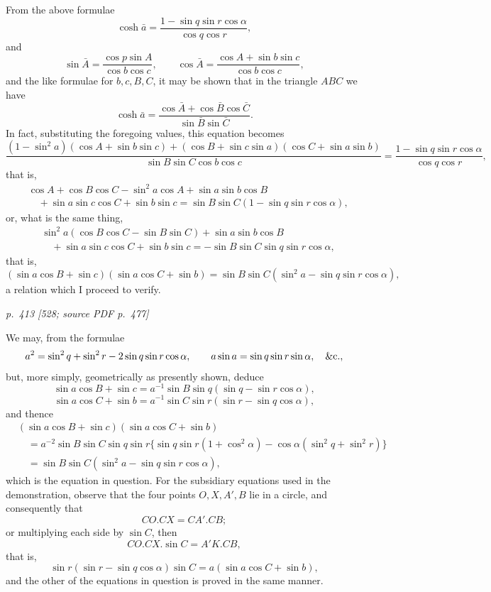\documentclass[11pt,a4paper]{article}
\newcommand{\pagemarker}[3]{\par\bigskip\noindent\textit{p.~#1 [#2; source PDF p.~#3]}\par\smallskip}
\begin{document}
From the above formulae
\[
\cosh\bar a=\frac{1-\sin q\sin r\cos\alpha}{\cos q\cos r},
\]
and
\[
\sin\bar A=\frac{\cos p\sin A}{\cos b\cos c},\qquad
\cos\bar A=\frac{\cos A+\sin b\sin c}{\cos b\cos c},
\]
and the like formulae for $b,c,B,C$, it may be shown that in the triangle $ABC$ we
have
\[
\cosh\bar a=\frac{\cos\bar A+\cos\bar B\cos\bar C}{\sin\bar B\sin\bar C}.
\]
In fact, substituting the foregoing values, this equation becomes
\[
\frac{(1-\sin^2a)(\cos A+\sin b\sin c)
+(\cos B+\sin c\sin a)(\cos C+\sin a\sin b)}
{\sin B\sin C\cos b\cos c}
=\frac{1-\sin q\sin r\cos\alpha}{\cos q\cos r},
\]
that is,
\[
\begin{aligned}
&\cos A+\cos B\cos C-\sin^2a\cos A+\sin a\sin b\cos B\\
&\quad+\sin a\sin c\cos C+\sin b\sin c
=\sin B\sin C(1-\sin q\sin r\cos\alpha),
\end{aligned}
\]
or, what is the same thing,
\[
\begin{aligned}
&\sin^2a(\cos B\cos C-\sin B\sin C)+\sin a\sin b\cos B\\
&\quad+\sin a\sin c\cos C+\sin b\sin c
=-\sin B\sin C\sin q\sin r\cos\alpha,
\end{aligned}
\]
that is,
\[
(\sin a\cos B+\sin c)(\sin a\cos C+\sin b)
=\sin B\sin C(\sin^2a-\sin q\sin r\cos\alpha),
\]
a relation which I proceed to verify.

\pagemarker{413}{528}{477}

We may, from the formulae
\[
a^2=\sin^2q+\sin^2r-2\sin q\sin r\cos\alpha,\qquad
a\sin a=\sin q\sin r\sin\alpha,\quad\hbox{\&c.},
\]
but, more simply, geometrically as presently shown, deduce
\[
\sin a\cos B+\sin c=a^{-1}\sin B\sin q(\sin q-\sin r\cos\alpha),
\]
\[
\sin a\cos C+\sin b=a^{-1}\sin C\sin r(\sin r-\sin q\cos\alpha),
\]
and thence
\[
\begin{aligned}
&(\sin a\cos B+\sin c)(\sin a\cos C+\sin b)\\
&\quad=a^{-2}\sin B\sin C\sin q\sin r
\{\sin q\sin r(1+\cos^2\alpha)-\cos\alpha(\sin^2q+\sin^2r)\}\\
&\quad=\sin B\sin C(\sin^2a-\sin q\sin r\cos\alpha),
\end{aligned}
\]
which is the equation in question. For the subsidiary equations used in the
demonstration, observe that the four points $O,X,A',B$ lie in a circle, and consequently
that
\[
CO.CX=CA'.CB;
\]
or multiplying each side by $\sin C$, then
\[
CO.CX.\sin C=A'K.CB,
\]
that is,
\[
\sin r(\sin r-\sin q\cos\alpha)\sin C
=a(\sin a\cos C+\sin b),
\]
and the other of the equations in question is proved in the same manner.
\end{document}
